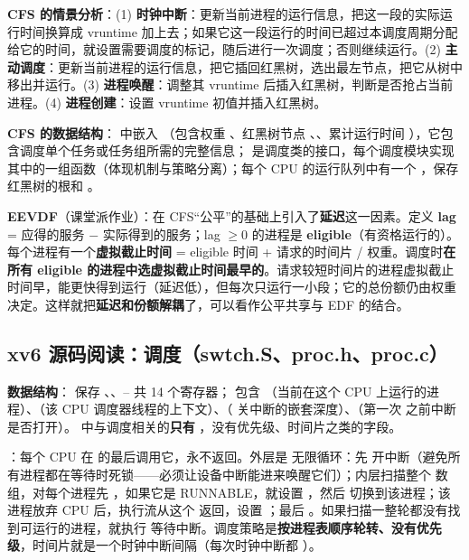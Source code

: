 \textbf{CFS 的情景分析}：(1) \textbf{时钟中断}：更新当前进程的运行信息，把这一段的实际运行时间换算成 vruntime 加上去；如果它这一段运行的时间已超过本调度周期分配给它的时间，就设置需要调度的标记，随后进行一次调度；否则继续运行。(2) \textbf{主动调度}：更新当前进程的运行信息，把它插回红黑树，选出最左节点，把它从树中移出并运行。(3) \textbf{进程唤醒}：调整其 vruntime 后插入红黑树，判断是否抢占当前进程。(4) \textbf{进程创建}：设置 vruntime 初值并插入红黑树。

\textbf{CFS 的数据结构}： 中嵌入 （包含权重 、红黑树节点 、、累计运行时间 ），它包含调度单个任务或任务组所需的完整信息； 是调度类的接口，每个调度模块实现其中的一组函数（体现机制与策略分离）；每个 CPU 的运行队列中有一个 ，保存红黑树的根和 。

\textbf{EEVDF}（课堂派作业）：在 CFS“公平”的基础上引入了\textbf{延迟}这一因素。定义 \textbf{lag} = 应得的服务 $-$ 实际得到的服务；lag $\ge 0$ 的进程是 \textbf{eligible}（有资格运行的）。每个进程有一个\textbf{虚拟截止时间} = eligible 时间 + 请求的时间片 / 权重。调度时\textbf{在所有 eligible 的进程中选虚拟截止时间最早的}。请求较短时间片的进程虚拟截止时间早，能更快得到运行（延迟低），但每次只运行一小段；它的总份额仍由权重决定。这样就把\textbf{延迟和份额解耦}了，可以看作公平共享与 EDF 的结合。

\subsection{xv6 源码阅读：调度（swtch.S、proc.h、proc.c）}

\textbf{数据结构}： 保存 、、– 共 14 个寄存器； 包含 （当前在这个 CPU 上运行的进程）、（该 CPU 调度器线程的上下文）、（ 关中断的嵌套深度）、（第一次  之前中断是否打开）。 中与调度相关的\textbf{只有 }，没有优先级、时间片之类的字段。

\textbf{}：每个 CPU 在  的最后调用它，永不返回。外层是  无限循环：先  开中断（避免所有进程都在等待时死锁——必须让设备中断能进来唤醒它们）；内层扫描整个  数组，对每个进程先 ，如果它是 RUNNABLE，就设置 ，然后  切换到该进程；该进程放弃 CPU 后，执行流从这个  返回，设置 ；最后 。如果扫描一整轮都没有找到可运行的进程，就执行  等待中断。调度策略是\textbf{按进程表顺序轮转、没有优先级}，时间片就是一个时钟中断间隔（每次时钟中断都 ）。

